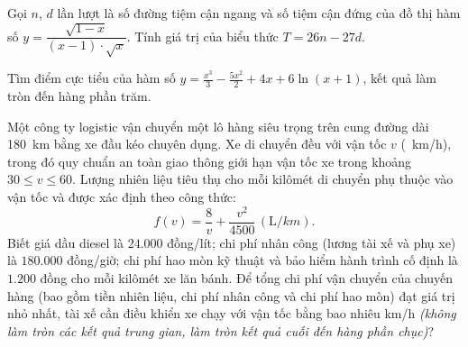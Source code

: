 \begin{baitap}
	Gọi $n$, $d$ lần lượt là số đường tiệm cận ngang và số tiệm cận đứng của đồ thị hàm số $y = \dfrac{\sqrt{1-x}}{(x-1)\cdot\sqrt{x}}$. Tính giá trị của biểu thức $T = 26n - 27d$.
\end{baitap}
\begin{baitap} %
	Tìm điểm cực tiểu của hàm số $y = \frac{x^3}{3} - \frac{5x^2}{2} + 4x + 6\ln(x + 1)$, kết quả làm tròn đến hàng phần trăm.
\end{baitap}
\begin{baitap} %
	Một công ty logistic vận chuyển một lô hàng siêu trọng trên cung đường dài \SI{180}{\kilo\meter} bằng xe đầu kéo chuyên dụng. Xe di chuyển đều với vận tốc $v$ (\SI{}{\kilo\meter/\hour}), trong đó quy chuẩn an toàn giao thông giới hạn vận tốc xe trong khoảng $30 \le v \le 60$. Lượng nhiên liệu tiêu thụ cho mỗi kilômét di chuyển phụ thuộc vào vận tốc và được xác định theo công thức: $$f(v) = \frac{8}{v} + \frac{v^2}{4500}\, (\si{\liter/km}).$$ Biết giá dầu diesel là $24.000$ đồng/lít; chi phí nhân công (lương tài xế và phụ xe) là $180.000$ đồng/giờ; chi phí hao mòn kỹ thuật và bảo hiểm hành trình cố định là $1.200$ đồng cho mỗi kilômét xe lăn bánh. Để tổng chi phí vận chuyển của chuyến hàng (bao gồm tiền nhiên liệu, chi phí nhân công và chi phí hao mòn) đạt giá trị nhỏ nhất, tài xế cần điều khiển xe chạy với vận tốc bằng bao nhiêu \si{km/h} \textit{(không làm tròn các kết quả trung gian, làm tròn kết quả cuối đến hàng phần chục)}?
\end{baitap}
